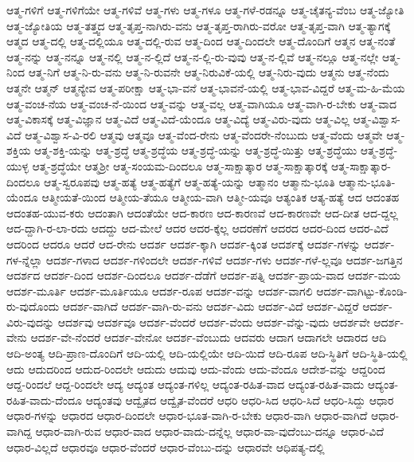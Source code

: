 {ಆತ್ಮ-ಗಳಿಗೆ
ಆತ್ಮ-ಗಳಿಗೆಯೇ
ಆತ್ಮ-ಗಳಿವೆ
ಆತ್ಮ-ಗಳು
ಆತ್ಮ-ಗಳೂ
ಆತ್ಮ-ಗಳೆ-ರಡನ್ನೂ
ಆತ್ಮ-ಚೈತನ್ಯ-ವೆಂಬ
ಆತ್ಮ-ಜ್ಯೋತಿ
ಆತ್ಮ-ಜ್ಯೋತಿಯ
ಆತ್ಮ-ತತ್ತ್ವದ
ಆತ್ಮ-ತೃಪ್ತ-ನಾಗಿರು-ವನು
ಆತ್ಮ-ತೃಪ್ತ-ರಾಗಿರು-ವರೋ
ಆತ್ಮ-ತೃಪ್ತ-ವಾಗಿ
ಆತ್ಮ-ತ್ಯಾಗಕ್ಕೆ
ಆತ್ಮದ
ಆತ್ಮ-ದಲ್ಲಿ
ಆತ್ಮ-ದಲ್ಲಿಯೂ
ಆತ್ಮ-ದಲ್ಲಿ-ರುವ
ಆತ್ಮ-ದಿಂದ
ಆತ್ಮ-ದಿಂದಲೇ
ಆತ್ಮ-ದೊಂದಿಗೆ
ಆತ್ಮನ
ಆತ್ಮ-ನಂತೆ
ಆತ್ಮ-ನನ್ನು
ಆತ್ಮ-ನನ್ನೂ
ಆತ್ಮ-ನಲ್ಲಿ
ಆತ್ಮ-ನ-ಲ್ಲಿದೆ
ಆತ್ಮ-ನ-ಲ್ಲಿ-ರು-ವುವು
ಆತ್ಮ-ನ-ಲ್ಲಿವೆ
ಆತ್ಮ-ನಲ್ಲೂ
ಆತ್ಮ-ನಲ್ಲೇ
ಆತ್ಮ-ನಿಂದ
ಆತ್ಮ-ನಿಗೆ
ಆತ್ಮ-ನಿ-ರು-ವನು
ಆತ್ಮ-ನಿ-ರುವನೇ
ಆತ್ಮ-ನಿರುವಿಕೆ-ಯಲ್ಲಿ
ಆತ್ಮ-ನಿರು-ವುದು
ಆತ್ಮನು
ಆತ್ಮ-ನೆಂದು
ಆತ್ಮನೇ
ಆತ್ಮನ್
ಆತ್ಮನ್ಯೇವ
ಆತ್ಮ-ಪರೀಕ್ಷಾ
ಆತ್ಮ-ಭಾ-ವನೆ
ಆತ್ಮ-ಭಾವನೆ-ಯಲ್ಲಿ
ಆತ್ಮ-ಭಾವ-ವಿದ್ದರೆ
ಆತ್ಮ-ಮ-ಹಿ-ಮೆಯ
ಆತ್ಮ-ವಂಚ-ನೆಯ
ಆತ್ಮ-ವಂಚ-ನೆ-ಯಿಂದ
ಆತ್ಮ-ವನ್ನು
ಆತ್ಮ-ವಲ್ಲ
ಆತ್ಮ-ವಾಗಿಯೂ
ಆತ್ಮ-ವಾಗಿ-ರ-ಬೇಕು
ಆತ್ಮ-ವಾದ
ಆತ್ಮ-ವಿಕಾಸಕ್ಕೆ
ಆತ್ಮ-ವಿಜ್ಞಾನ
ಆತ್ಮ-ವಿದೆ
ಆತ್ಮ-ವಿದೆ-ಯೆಂದೂ
ಆತ್ಮ-ವಿದ್ಯೆ
ಆತ್ಮ-ವಿರು-ವುದು
ಆತ್ಮ-ವಿಲ್ಲ
ಆತ್ಮ-ವಿಶ್ವಾಸ-ವಿದೆ
ಆತ್ಮ-ವಿಶ್ವಾಸ-ವಿ-ರಲಿ
ಆತ್ಮವು
ಆತ್ಮವೂ
ಆತ್ಮ-ವೆಂದ-ರೇನು
ಆತ್ಮ-ವೆಂದರೇ-ನೆಂಬುದು
ಆತ್ಮ-ವೆಂದು
ಆತ್ಮವೇ
ಆತ್ಮ-ಶಕ್ತಿಯ
ಆತ್ಮ-ಶಕ್ತಿ-ಯನ್ನು
ಆತ್ಮ-ಶ್ರದ್ಧೆ
ಆತ್ಮ-ಶ್ರದ್ಧೆಯ
ಆತ್ಮ-ಶ್ರದ್ಧೆ-ಯನ್ನು
ಆತ್ಮ-ಶ್ರದ್ಧೆ-ಯಿತ್ತು
ಆತ್ಮ-ಶ್ರದ್ಧೆಯು
ಆತ್ಮ-ಶ್ರದ್ಧೆ-ಯುಳ್ಳ
ಆತ್ಮ-ಶ್ರದ್ಧೆಯೇ
ಆತ್ಮಶ್ರೀ
ಆತ್ಮ-ಸಂಯಮ-ದಿಂದಲೂ
ಆತ್ಮ-ಸಾಕ್ಷಾತ್ಕಾರ
ಆತ್ಮ-ಸಾಕ್ಷಾತ್ಕಾರಕ್ಕೆ
ಆತ್ಮ-ಸಾಕ್ಷಾತ್ಕಾರ-ದಿಂದಲೂ
ಆತ್ಮ-ಸ್ವರೂಪವು
ಆತ್ಮ-ಹತ್ಯೆ
ಆತ್ಮ-ಹತ್ಯೆಗೆ
ಆತ್ಮ-ಹತ್ಯೆ-ಯನ್ನು
ಆತ್ಮಾನಂ
ಆತ್ಮಾನು-ಭೂತಿ
ಆತ್ಮಾನು-ಭೂತಿ-ಯೆಂದೂ
ಆತ್ಮೀಯತೆ-ಯಿಂದ
ಆತ್ಮೀಯ-ತೆಯೂ
ಆತ್ಮೀಯ-ವಾಗಿ
ಆತ್ಮೀ-ಯವೂ
ಆತ್ಯಂತಿಕ
ಆತ್ಯ-ಹತ್ಯೆ
ಆದ
ಆದಂತಹ
ಆದಂತಹ-ಯುವ-ಕರು
ಆದಂತಾಗಿ
ಆದಂತೆಯೇ
ಆದ-ಕಾರಣ
ಆದ-ಕಾರಣವೆ
ಆದ-ಕಾರಣವೇ
ಆದ-ದೀತ
ಆದ-ದ್ದಲ್ಲ
ಆದ-ದ್ದಾಗಿ-ರ-ಲಾ-ರದು
ಆದದ್ದು
ಆದ-ಮೇಲೆ
ಆದರ
ಆದರ-ಕ್ಕೆಲ್ಲ
ಆದರಣೆಗೆ
ಆದರದ
ಆದರ-ದಿಂದ
ಆದರ-ವಿದೆ
ಆದರಿಂದ
ಆದರೂ
ಆದರೆ
ಆದ-ರೇನು
ಆದರ್ಶ
ಆದರ್ಶ-ಕ್ಕಾಗಿ
ಆದರ್ಶ-ಕ್ಕಿಂತ
ಆದರ್ಶಕ್ಕೆ
ಆದರ್ಶ-ಗಳನ್ನು
ಆದರ್ಶ-ಗಳ-ನ್ನೆಲ್ಲಾ
ಆದರ್ಶ-ಗಳಾದ
ಆದರ್ಶ-ಗಳಿಂದಲೇ
ಆದರ್ಶ-ಗಳಿವೆ
ಆದರ್ಶ-ಗಳು
ಆದರ್ಶ-ಗಳೆ-ಲ್ಲವೂ
ಆದರ್ಶ-ಜಗತ್ತಿನ
ಆದರ್ಶದ
ಆದರ್ಶ-ದಿಂದ
ಆದರ್ಶ-ದಿಂದಲೂ
ಆದರ್ಶ-ದೆಡೆಗೆ
ಆದರ್ಶ-ಪತ್ನಿ
ಆದರ್ಶ-ಪ್ರಾಯ-ವಾದ
ಆದರ್ಶ-ಮಯ
ಆದರ್ಶ-ಮೂರ್ತಿ
ಆದರ್ಶ-ಮೂರ್ತಿಯೂ
ಆದರ್ಶ-ರೂಪ
ಆದರ್ಶ-ವನ್ನು
ಆದರ್ಶ-ವಾಗಲಿ
ಆದರ್ಶ-ವಾಗಿಟ್ಟು-ಕೊಂಡಿ-ರು-ವುದೊಂದು
ಆದರ್ಶ-ವಾಗಿದೆ
ಆದರ್ಶ-ವಾಗಿ-ರು-ವನು
ಆದರ್ಶ-ವಿದು
ಆದರ್ಶ-ವಿದೆ
ಆದರ್ಶ-ವಿದ್ದರೆ
ಆದರ್ಶ-ವಿರು-ವುದನ್ನು
ಆದರ್ಶವು
ಆದರ್ಶವೂ
ಆದರ್ಶ-ವೆಂದರೆ
ಆದರ್ಶ-ವೆಂದು
ಆದರ್ಶ-ವೆನ್ನು-ವುದು
ಆದರ್ಶವೇ
ಆದರ್ಶ-ವೇನು
ಆದರ್ಶ-ವೇ-ನೆಂದರೆ
ಆದರ್ಶ-ವೇನೋ
ಆದರ್ಶ-ವೆಂಬುದು
ಆದವರು
ಆದಾಗ
ಆದಾಗಲೇ
ಆದಾರದ
ಆದಿ
ಆದಿ-ಅಂತ್ಯ
ಆದಿ-ಪ್ರಾಣ-ದೊಂದಿಗೆ
ಆದಿ-ಯಲ್ಲಿ
ಆದಿ-ಯಲ್ಲಿಯೇ
ಆದಿ-ಯಿದೆ
ಆದಿ-ರೂಪ
ಆದಿ-ಸ್ಥಿತಿಗೆ
ಆದಿ-ಸ್ಥಿತಿ-ಯಲ್ಲಿ
ಆದು
ಆದುದರಿಂದ
ಆದುದ-ರಿಂದಲೇ
ಆದುದು
ಆದುವು
ಆದು-ವೆಂದು
ಆದು-ವೆಂದೂ
ಆದೇಶ-ವನ್ನು
ಆದ್ದರಿಂದ
ಆದ್ದ-ರಿಂದಲೆ
ಆದ್ದ-ರಿಂದಲೇ
ಆದ್ಯ
ಆದ್ಯಂತ
ಆದ್ಯಂತ-ಗಳಿಲ್ಲ
ಆದ್ಯಂತ-ರಹಿತ-ವಾದ
ಆದ್ಯಂತ-ರಹಿತ-ವಾದು
ಆದ್ಯಂತ-ರಹಿತ-ವಾದು-ದೆಂದೂ
ಆದ್ಯಂತವು
ಆದ್ವೈತದ
ಆದ್ವೈತ-ವೆಂದರೆ
ಆಧರಿ
ಆಧರಿ-ಸಿದ
ಆಧರಿ-ಸಿದೆ
ಆಧರಿ-ಸಿದ್ದು
ಆಧಾರ
ಆಧಾರ-ಗಳನ್ನು
ಆಧಾರದ
ಆಧಾರ-ದಿಂದಲೇ
ಆಧಾರ-ಭೂತ-ವಾಗಿ-ರ-ಬೇಕು
ಆಧಾರ-ವಾಗಿ
ಆಧಾರ-ವಾಗಿದೆ
ಆಧಾರ-ವಾಗಿದ್ದ
ಆಧಾರ-ವಾಗಿ-ರುವ
ಆಧಾರ-ವಾದ
ಆಧಾರ-ವಾದು-ದನ್ನೆಲ್ಲ
ಆಧಾರ-ವಾ-ವುದೆಂಬು-ದನ್ನೂ
ಆಧಾರ-ವಿದೆ
ಆಧಾರ-ವಿಲ್ಲದೆ
ಆಧಾರವೂ
ಆಧಾರ-ವೆಂದರೆ
ಆಧಾರ-ವೆಂಬು-ದನ್ನು
ಆಧಾರವೇ
ಆಧಿಪತ್ಯ-ದಲ್ಲಿ
}
